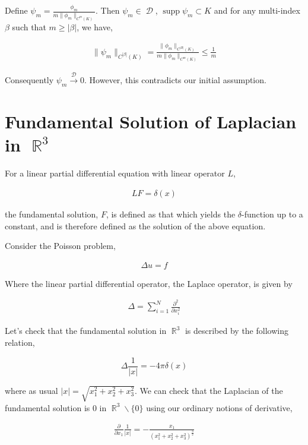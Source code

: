 \documentclass[12pt, a4]{article}
\DeclareMathOperator\supp{supp}
\DeclareMathOperator\reals{\mathbb{R}}
\DeclareMathOperator\tfspaceD{\mathcal{D}}
\begin{document}
Define $\psi_m = \frac{\phi_m}{m \| \phi_m \|_{C^m(K)}}$. Then $\psi_m \in \tfspaceD$, $\supp \psi_m \subset K$ and for any multi-index $\beta$ such that $m \geq |\beta|$, we have,

\begin{eqnarray}
    \| \psi_m \|_{C^{|\beta|}(K)} = \frac{\|\phi_m\|_{C^{|B|}(K)}}{m \|\phi_m\|_{C^m(K)}} \leq \frac{1}{m}
\end{eqnarray}

Consequently $\psi_m \overset{\tfspaceD}{\rightarrow} 0$. However, this contradicts our initial assumption.

\section{Fundamental Solution of Laplacian in $\reals^3$}

For a linear partial differential equation with linear operator $L$,

\begin{eqnarray}
    LF = \delta(x)
\end{eqnarray}

the fundamental solution, $F$,  is defined as that which yields the $\delta$-function up to a constant, and is therefore defined as the solution of the above equation.

Consider the Poisson problem,

\begin{eqnarray}
    \Delta u = f
    \label{eq:laplace}
\end{eqnarray}

Where the linear partial differential operator, the Laplace operator, is given by

\begin{eqnarray}
    \Delta = \sum_{i=1}^N \frac{\partial^2}{\partial x_i^2}
\end{eqnarray}

Let's check that the fundamental solution in $\reals^3$ is described by the following relation,

\begin{equation}
    \Delta \frac{1}{|x|} = -4\pi \delta(x)
\end{equation}

where as usual $|x| = \sqrt{x_1^2+x_2^2+x_3^2}$. We can check that the Laplacian of the fundamental solution is 0 in $\reals^3 \backslash \{ 0\}$ using our ordinary notions of derivative,

\begin{eqnarray}
    \frac{\partial}{\partial x_1} \frac{1}{|x|} = -\frac{x_1}{(x_1^2+x_2^2+x_3^2)^{\frac{3}{2}}}
\end{eqnarray}
\end{document}

